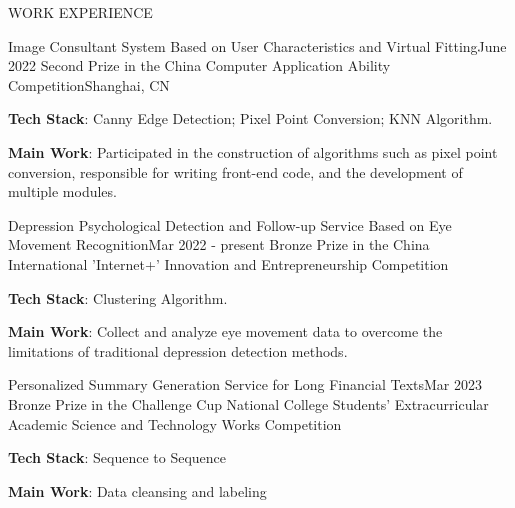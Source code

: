 \documentclass{resume} %
\begin{document}
\begin{rSection}{WORK EXPERIENCE}

  \begin{rSubsection}{Image Consultant System Based on User Characteristics and Virtual Fitting}{June 2022 }{Second Prize in the China Computer Application Ability Competition}{Shanghai, CN}
    \item \textbf{Tech Stack}: Canny Edge Detection; Pixel Point Conversion; KNN Algorithm.
    \item \textbf{Main Work}: 
Participated in the construction of algorithms such as pixel point conversion, responsible for writing front-end code, and the development of multiple modules.
  \end{rSubsection}

  \begin{rSubsection}{Depression Psychological Detection and Follow-up Service Based on Eye Movement Recognition}{Mar 2022 - present }{Bronze Prize in the China International 'Internet+' Innovation and Entrepreneurship Competition }{}
    \item \textbf{Tech Stack}: Clustering Algorithm.
    \item \textbf{Main Work}: 
Collect and analyze eye movement data to overcome the limitations of traditional depression detection methods.
  \end{rSubsection}

  \begin{rSubsection}{Personalized Summary Generation Service for Long Financial Texts}{Mar 2023 }{Bronze Prize in the Challenge Cup National College Students' Extracurricular Academic Science and Technology Works Competition}{}
      \item \textbf{Tech Stack}: Sequence to Sequence
    \item \textbf{Main Work}: Data cleansing and labeling


\end{rSubsection}
\end{rSection}
\end{document}
